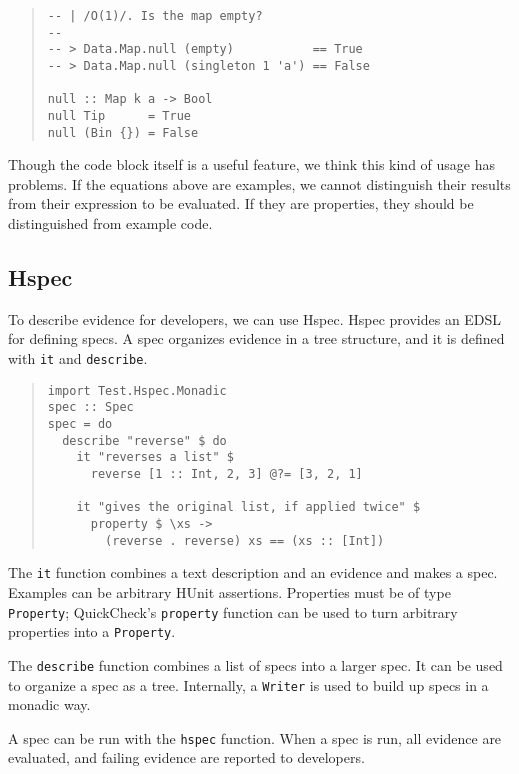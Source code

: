 \documentclass[preprint]{sigplanconf}
\begin{document}
\begin{quote}
\small
\begin{verbatim}
-- | /O(1)/. Is the map empty?
--
-- > Data.Map.null (empty)           == True
-- > Data.Map.null (singleton 1 'a') == False

null :: Map k a -> Bool
null Tip      = True
null (Bin {}) = False
\end{verbatim}
\end{quote}

\noindent Though the code block itself is a useful feature,
we think this kind of usage has problems.
If the equations above are examples, we cannot distinguish
their results from their expression to be evaluated.
If they are properties, they should be distinguished
from example code.

\subsection{Hspec}

To describe evidence for developers, we can use Hspec.
Hspec provides an EDSL for defining specs.  A spec organizes evidence in a
tree structure, and it is defined with \texttt{it} and \texttt{describe}.

\begin{quote}
\small
\begin{verbatim}
import Test.Hspec.Monadic
spec :: Spec
spec = do
  describe "reverse" $ do
    it "reverses a list" $
      reverse [1 :: Int, 2, 3] @?= [3, 2, 1]

    it "gives the original list, if applied twice" $
      property $ \xs ->
        (reverse . reverse) xs == (xs :: [Int])
\end{verbatim}
\end{quote}

\noindent The {\tt it} function combines a text description and
an evidence and makes a spec.
Examples can be arbitrary HUnit assertions.  Properties must be of type {\tt
Property}; QuickCheck's \texttt{property} function can be used to turn
arbitrary properties into a \texttt{Property}.

The \texttt{describe} function combines a list of specs into a larger spec.  It
can be used to organize a spec as a tree.
Internally, a \texttt{Writer} is used to build up specs in a monadic way.

A spec can be run with the \texttt{hspec} function.  When a spec is run, all
evidence are evaluated, and failing evidence are reported to developers.
\end{document}
